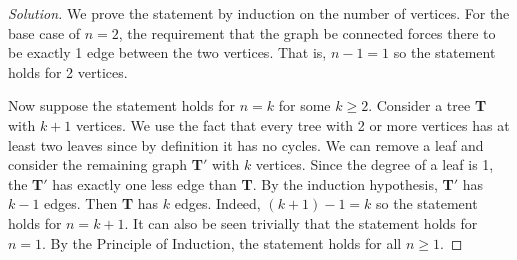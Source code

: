 \documentclass[12pt]{article}
\theoremstyle{definition}
\newenvironment{solution}{
  \begin{proof}[Solution]
    \vspace{-8px}
    \setlength{\parskip}{4px}
    \setlength{\parindent}{0px}
}{
\end{proof}
}
\begin{document}
  \begin{solution}
    We prove the statement by induction on the number of vertices. For the base case of \(n=2\), the requirement that the graph be connected forces there to be exactly 1 edge between the two vertices. That is, \(n-1=1\) so the statement holds for 2 vertices.

    Now suppose the statement holds for \(n=k\) for some \(k \geq 2\). Consider a tree \textbf{T} with \(k+1\) vertices. We use the fact that every tree with 2 or more vertices has at least two leaves since by definition it has no cycles. We can remove a leaf and consider the remaining graph \textbf{T}\('\) with \(k\) vertices. Since the degree of a leaf is 1, the \textbf{T}\('\) has exactly one less edge than \textbf{T}. By the induction hypothesis, \textbf{T}\('\) has \(k-1\) edges. Then \textbf{T} has \(k\) edges. Indeed, \((k + 1) - 1 = k\) so the statement holds for \(n=k+1\). It can also be seen trivially that the statement holds for \(n=1\). By the Principle of Induction, the statement holds for all \(n \geq 1\).
  \end{solution}
\end{document}
